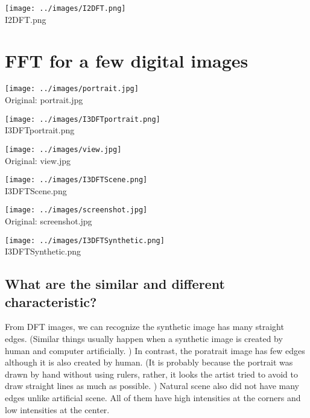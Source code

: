 \documentclass[article,oneside]{memoir}
\begin{document}
\begin{center}
\texttt{[image: ../images/I2DFT.png]}\\
I2DFT.png
\end{center}

\section{FFT for a few digital images}

\begin{center}
\texttt{[image: ../images/portrait.jpg]}\\
Original: portrait.jpg
\end{center}

\begin{center}
\texttt{[image: ../images/I3DFTportrait.png]}\\
I3DFTportrait.png
\end{center}

\begin{center}
\texttt{[image: ../images/view.jpg]}\\
Original: view.jpg
\end{center}

\begin{center}
\texttt{[image: ../images/I3DFTScene.png]}\\
I3DFTScene.png
\end{center}

\begin{center}
\texttt{[image: ../images/screenshot.jpg]}\\
Original: screenshot.jpg
\end{center}

\begin{center}
\texttt{[image: ../images/I3DFTSynthetic.png]}\\
I3DFTSynthetic.png
\end{center}

\newpage

\subsection{What are the similar and different characteristic?}

From DFT images, we can recognize the synthetic image has many straight edges. 
(Similar things usually happen when a synthetic image is created by human and computer artificially. )
In contrast, the poratrait image has few edges although it is also created by human. 
(It is probably because the portrait was drawn by hand without using rulers, rather, it looks the artist tried to avoid to draw straight lines as much as possible. )
Natural scene also did not have many edges unlike artificial scene. 
All of them have high intensities at the corners and low intensities at the center. 
\end{document}
